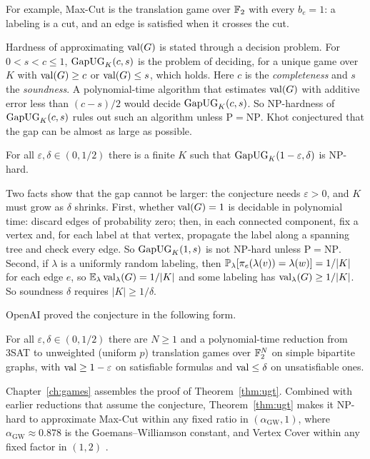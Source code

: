 For example, Max-Cut is the translation game over $\mathbb{F}_2$ with every $b_e=1$: a labeling is a cut, and an edge is satisfied when it crosses the cut.

\label{nt:gap}Hardness of approximating $\operatorname{val}(G)$ is stated through a decision problem. For $0<s<c\le1$, $\mathrm{GapUG}_K(c,s)$ is the problem of deciding, for a unique game over $K$ with $\operatorname{val}(G)\ge c$ or $\operatorname{val}(G)\le s$, which holds. Here $c$ is the \emph{completeness} and $s$ the \emph{soundness}. A polynomial-time algorithm that estimates $\operatorname{val}(G)$ with additive error less than $(c-s)/2$ would decide $\mathrm{GapUG}_K(c,s)$. So NP-hardness of $\mathrm{GapUG}_K(c,s)$ rules out such an algorithm unless $\mathrm{P}=\mathrm{NP}$. Khot conjectured that the gap can be almost as large as possible.

\begin{conjecture}\label{conj:ugc}
For all $\varepsilon,\delta\in(0,1/2)$ there is a finite $K$ such that $\mathrm{GapUG}_K(1-\varepsilon,\delta)$ is NP-hard.
\end{conjecture}

Two facts show that the gap cannot be larger: the conjecture needs $\varepsilon>0$, and $K$ must grow as $\delta$ shrinks. First, whether $\operatorname{val}(G)=1$ is decidable in polynomial time: discard edges of probability zero; then, in each connected component, fix a vertex and, for each label at that vertex, propagate the label along a spanning tree and check every edge. So $\mathrm{GapUG}_K(1,s)$ is not NP-hard unless $\mathrm{P}=\mathrm{NP}$. Second, if $\lambda$ is a uniformly random labeling, then $\mathbb{P}_\lambda[\pi_e(\lambda(v))=\lambda(w)]=1/|K|$ for each edge $e$, so $\mathbb{E}_\lambda\operatorname{val}_\lambda(G)=1/|K|$ and some labeling has $\operatorname{val}_\lambda(G)\ge1/|K|$. So soundness $\delta$ requires $|K|\ge1/\delta$.

OpenAI proved the conjecture in the following form.

\begin{theorem}\label{thm:ugt}
For all $\varepsilon,\delta\in(0,1/2)$ there are $N\ge1$ and a polynomial-time reduction from 3SAT to unweighted (uniform $p$) translation games over $\mathbb{F}_2^N$ on simple bipartite graphs, with $\operatorname{val}\ge1-\varepsilon$ on satisfiable formulas and $\operatorname{val}\le\delta$ on unsatisfiable ones.
\end{theorem}

Chapter~\ref{ch:games} assembles the proof of Theorem~\ref{thm:ugt}. Combined with earlier reductions that assume the conjecture, Theorem~\ref{thm:ugt} makes it NP-hard to approximate Max-Cut within any fixed ratio in $(\alpha_{\mathrm{GW}},1)$, where $\alpha_{\mathrm{GW}}\approx0.878$ is the Goemans--Williamson constant, and Vertex Cover within any fixed factor in $(1,2)$ \cite[Section~8.1]{OAI}.

